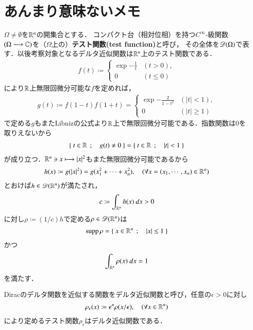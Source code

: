 \section{あんまり意味ないメモ}
	$\Omega \neq \emptyset$を$\mathbb{R}^n$の開集合とする．
	コンパクト台（相対位相）を持つ$C^\infty$-級関数$(\Omega \longrightarrow \mathbb{C})$を（$\Omega$上の）{\bf テスト関数(test function)}と呼び，
	その全体を$\mathscr{D}(\Omega)$で表す．以後考察対象となるデルタ近似関数は$\mathbb{R}^n$上のテスト関数である．
	\begin{align}
		f(t) \coloneqq 
		\begin{cases}
			\exp{-\frac{1}{t}} & (t > 0), \\
			0 & (t \leq 0)
		\end{cases}
	\end{align}
	により$\mathbb{R}$上無限回微分可能な$f$を定めれば，
	\begin{align}
		g(t) \coloneqq f(1-t)f(1+t) = 
		\begin{cases}
			\exp{-\frac{2}{1-t^2}} & (|t| < 1), \\
			0 & (|t| \geq 1)
		\end{cases}
	\end{align}
	で定める$g$もまたLibnizの公式より$\mathbb{R}$上で無限回微分可能である．指数関数は0を取りえないから
	\begin{align}
		\left\{\ t \in \mathbb{R}\ \, ; \quad g(t) \neq 0\ \right\} = \left\{\ t \in \mathbb{R}\ \, ; \quad |t| < 1\ \right\}
	\end{align}
	が成り立つ．$\mathbb{R}^n \ni x \longmapsto |x|^2$もまた無限回微分可能であるから
	\begin{align}
		h(x) \coloneqq g(|x|^2) = g(x_1^2+ \cdots + x_n^2),
		\quad (\forall x=(x_1,\cdots,x_n) \in \mathbb{R}^n)
	\end{align}
	とおけば$h \in \mathscr{D}(\mathbb{R}^n)$が満たされ，
	\begin{align}
		c \coloneqq \int_{\mathbb{R}^n} h(x)\ dx > 0
	\end{align}
	に対し$\rho \coloneqq (1/c)h$で定める$\rho \in \mathscr{D}(\mathbb{R}^n)$は
	\begin{align}
		\operatorname{supp} \rho = \left\{\ x \in \mathbb{R}^n\ \, ; \quad |x| \leq 1\ \right\}
	\end{align}
	かつ
	\begin{align}
		\int_{\mathbb{R}^n} \rho(x)\ dx = 1
	\end{align}
	を満たす．
	
	\begin{screen}
		\begin{dfn}[デルタ近似関数]
			Diracのデルタ関数を近似する関数をデルタ近似関数と呼び，任意の$\epsilon > 0$に対し
			\begin{align}
				\rho_\epsilon(x) \coloneqq \epsilon^n \rho(x/\epsilon),
				\quad (\forall x \in \mathbb{R}^n)
			\end{align}
			により定めるテスト関数$\rho_\epsilon$はデルタ近似関数である．
		\end{dfn}
	\end{screen}
	
